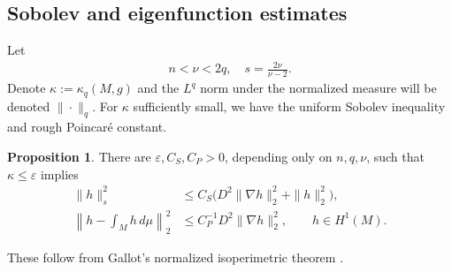 \documentclass[11pt]{amsart}
\def \eps {\varepsilon}
\theoremstyle{definition}
\newtheorem{proposition}[theorem]{Proposition}
\begin{document}
\subsection{Sobolev and eigenfunction estimates}
Let
\begin{align*}
    n<\nu<2q, \quad s=\frac{2\nu}{\nu-2}.
\end{align*}
Denote $\kappa:=\kappa_q(M,g)$ and the $L^q$ norm under the normalized measure will be denoted $\|\cdot\|_q$.  For $\kappa$ sufficiently small, we have the uniform Sobolev inequality and rough Poincar\'e constant.

\begin{proposition}\label{prop:geometry}
There are $\eps,C_S,C_P>0$, depending only on
$n,q,\nu$, such that $\kappa\le\eps$ implies
\begin{align}
 \|h\|_{s}^2
 &\le C_S\bigl(D^2\|\nabla h\|_2^2+\|h\|_2^2\bigr),
 \label{eq:sobolev}\\
 \left\|h-\int_Mh\,d\mu\right\|_2^2
 &\le C_P^{-1}D^2\|\nabla h\|_2^2,
 \qquad h\in H^1(M).
 \label{eq:poincare}
\end{align}
\end{proposition}

These follow from Gallot's normalized isoperimetric theorem
\cite[Theorem~3, Theorem~6]{Gallot1988}.
\end{document}
